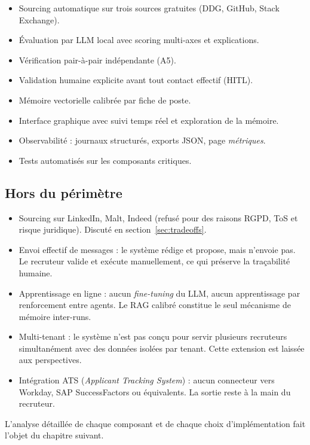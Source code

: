 \begin{itemize}[leftmargin=1cm]
\item Sourcing automatique sur trois sources gratuites (DDG, GitHub, Stack Exchange).
\item Évaluation par LLM local avec scoring multi-axes et explications.
\item Vérification pair-à-pair indépendante (A5).
\item Validation humaine explicite avant tout contact effectif (HITL).
\item Mémoire vectorielle calibrée par fiche de poste.
\item Interface graphique avec suivi temps réel et exploration de la mémoire.
\item Observabilité : journaux structurés, exports JSON, page \emph{métriques}.
\item Tests automatisés sur les composants critiques.
\end{itemize}

\subsection{Hors du périmètre}

\begin{itemize}[leftmargin=1cm]
\item Sourcing sur LinkedIn, Malt, Indeed (refusé pour des raisons RGPD, ToS et risque juridique). Discuté en section~\ref{sec:tradeoffs}.
\item Envoi effectif de messages : le système rédige et propose, mais n'envoie pas. Le recruteur valide et exécute manuellement, ce qui préserve la traçabilité humaine.
\item Apprentissage en ligne : aucun \emph{fine-tuning} du LLM, aucun apprentissage par renforcement entre agents. Le RAG calibré constitue le seul mécanisme de mémoire inter-runs.
\item Multi-tenant : le système n'est pas conçu pour servir plusieurs recruteurs simultanément avec des données isolées par tenant. Cette extension est laissée aux perspectives.
\item Intégration ATS (\emph{Applicant Tracking System}) : aucun connecteur vers Workday, SAP SuccessFactors ou équivalents. La sortie reste à la main du recruteur.
\end{itemize}

L'analyse détaillée de chaque composant et de chaque choix d'implémentation fait l'objet du chapitre suivant.
